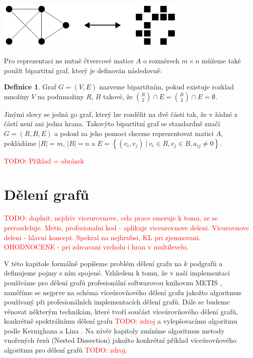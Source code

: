\documentclass[11pt,american,czech,oneside]{book}
\theoremstyle{plain}
\theoremstyle{definition}
\newtheorem{definition}{Definice}
\newcommand{\TODO}[1]{\textcolor{red}{TODO: #1}}
\begin{document}
\bigskip
{
  \label{MatGrPicture}
  \centering
  \includegraphics[width=0.7\textwidth]{pictures/matgr.pdf}
}
\bigskip

Pro reprezentaci ne nutně čtvercové matice $A$ o rozměrech $m\times n$ můžeme také použít bipartitní graf, který je definován následovně:

\begin{definition}
  Graf $G=(V,E)$ nazveme bipartitním, pokud existuje rozklad množiny $V$ na podmnožiny $R$, $B$ takové, že ${R \choose 2} \cap E = {B \choose 2} \cap E = \emptyset$.
\end{definition}

Jinými slovy se jedná go graf, který lze rozdělit na dvě části tak, že v žádné z částí není ani jedna hrana. Takovýto bipartitní graf se standardně značí $G=(R,B,E)$ a pokud za jeho pomoci chceme reprezentovat matici $A$, pokládáme $|R|=m$, $|B|=n$ a $E = \left\{(v_i,v_j) \ | \ v_i \in R, v_j \in B, a_{ij} \neq 0 \right\}$.

\TODO{Příklad = obrázek}


\chapter{Dělení grafů}
\TODO{doplnit, nejdriv viceurovnove, cela prace smeruje k tomu, ze se prerozdeluje. Metis, profesionalni kod - aplikuje viceurovnove deleni. Vicurovnove deleni - hlavni koncept. Spekral na nejhrubsi, KL pri zjemnovani. OHODNOCENE - pri zdrcavani vrcholu i hran v multilevelu.}

V této kapitole formálně popíšeme problém dělení grafu na $k$ podgrafů a definujeme pojmy s ním spojené. Vzhledem k tomu, že v naší implementaci používáme pro dělení grafů profesionální softwarovou knihovnu METIS \cite{kary:13}, zaměříme se nejprve na schéma víceúrovňového dělení grafu jakožto algoritmus používaný při profesionálních implementacích dělení grafů. Dále se budeme věnovat některým technikám, které tvoří součást víceúrovňového dělení grafů, konkrétně spektrálnímu dělení grafu \TODO{zdroj} a vylepšovacímu algoritmu podle Kernighana a Lina \cite{keli:70}. Na závěr kapitoly zmíníme algoritmus metody vnořených řezů (Nested Dissection) jakožto konkrétní příklad víceúrovňového algoritmu pro dělení grafů \TODO{zdroj}.
\end{document}
